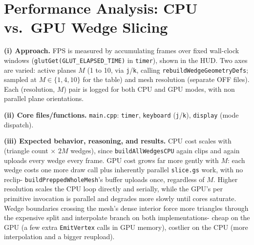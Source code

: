 \documentclass[10pt]{article}
\begin{document}
\section{Performance Analysis: CPU vs.\ GPU Wedge Slicing}
\textbf{(i) Approach.} FPS is measured by accumulating frames over fixed wall-clock windows 
(\texttt{glutGet(GLUT\_ELAPSED\_TIME)} in \texttt{timer}), shown in the HUD. 
Two axes are varied: active planes $M$ (1 to 10, via \texttt{j}/\texttt{k}, calling
\texttt{rebuildWedgeGeometryDefs}; sampled at $M \in \{1,4,10\}$ for the table) and
mesh resolution (separate OFF files). Each (resolution, $M$) 
pair is logged for both CPU and GPU modes, with non parallel plane orientations.

\textbf{(ii) Core files/functions.} \texttt{main.cpp}: \texttt{timer}, \texttt{keyboard} (\texttt{j}/\texttt{k}), \texttt{display} (mode dispatch).

\textbf{(iii) Expected behavior, reasoning, and results.} CPU cost scales with 
(triangle count $\times$ $2M$ wedges), since \texttt{buildAllWedgesCPU} 
again clips and again uploads every wedge every frame. GPU cost grows far more
 gently with $M$: each wedge costs one more draw call plus inherently 
 parallel \texttt{slice.gs} work, with no reclip- \texttt{buildPreppedWholeMesh}'s buffer uploads once, 
 regardless of $M$. Higher resolution scales the CPU loop directly 
 and serially, while the GPU's per primitive invocation is  
 parallel and degrades more slowly until cores saturate. Wedge boundaries 
 crossing the mesh's dense interior force more triangles through the expensive 
 split and interpolate branch on both implementations- cheap on the GPU 
 (a few extra \texttt{EmitVertex} calls in GPU memory), costlier on the CPU 
 (more interpolation and a bigger reupload).



\end{document}
